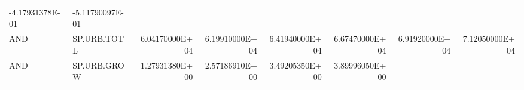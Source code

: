 \documentclass[]{article}
\begin{document}
\begin{longtable}[]{@{}llrrrrrr@{}}
\begin{minipage}[t]{0.11\columnwidth}
-4.17931378E-01\strut
\end{minipage} & \begin{minipage}[t]{0.11\columnwidth}\raggedleft\strut
-5.11790097E-01\strut
\end{minipage}\tabularnewline
\begin{minipage}[t]{0.06\columnwidth}\raggedright\strut
AND\strut
\end{minipage} & \begin{minipage}[t]{0.08\columnwidth}\raggedright\strut
SP.URB.TOTL\strut
\end{minipage} & \begin{minipage}[t]{0.11\columnwidth}\raggedleft\strut
6.04170000E+04\strut
\end{minipage} & \begin{minipage}[t]{0.11\columnwidth}\raggedleft\strut
6.19910000E+04\strut
\end{minipage} & \begin{minipage}[t]{0.11\columnwidth}\raggedleft\strut
6.41940000E+04\strut
\end{minipage} & \begin{minipage}[t]{0.11\columnwidth}\raggedleft\strut
6.67470000E+04\strut
\end{minipage} & \begin{minipage}[t]{0.11\columnwidth}\raggedleft\strut
6.91920000E+04\strut
\end{minipage} & \begin{minipage}[t]{0.11\columnwidth}\raggedleft\strut
7.12050000E+04\strut
\end{minipage}\tabularnewline
\begin{minipage}[t]{0.06\columnwidth}\raggedright\strut
AND\strut
\end{minipage} & \begin{minipage}[t]{0.08\columnwidth}\raggedright\strut
SP.URB.GROW\strut
\end{minipage} & \begin{minipage}[t]{0.11\columnwidth}\raggedleft\strut
1.27931380E+00\strut
\end{minipage} & \begin{minipage}[t]{0.11\columnwidth}\raggedleft\strut
2.57186910E+00\strut
\end{minipage} & \begin{minipage}[t]{0.11\columnwidth}\raggedleft\strut
3.49205350E+00\strut
\end{minipage} & \begin{minipage}[t]{0.11\columnwidth}\raggedleft\strut
3.89996050E+00\strut

\end{minipage}
\end{longtable}
\end{document}
